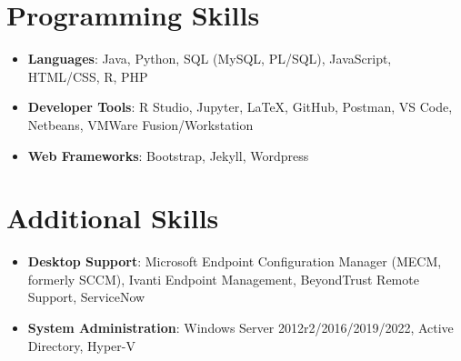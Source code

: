 \documentclass[letterpaper,11pt]{article}
\newcommand{\resumeItem}[2]{
  \item\small{
    \textbf{#1}{: #2 \vspace{-2pt}}
  }
}
\newcommand{\resumeSubItem}[2]{\resumeItem{#1}{#2}\vspace{-4pt}}
\newcommand{\resumeSubHeadingListStart}{\begin{itemize}[leftmargin=*]}
\newcommand{\resumeSubHeadingListEnd}{\end{itemize}}
\begin{document}
\section{Programming Skills}
  	\resumeSubHeadingListStart
    	\resumeSubItem{Languages}{Java, Python, SQL (MySQL, PL/SQL), JavaScript, HTML/CSS, R, PHP} 
   		\resumeSubItem{Developer Tools}{R Studio, Jupyter, LaTeX, GitHub, Postman, VS Code, Netbeans, VMWare Fusion/Workstation}
    	\resumeSubItem{Web Frameworks}{Bootstrap,  Jekyll, Wordpress} 
  	\resumeSubHeadingListEnd

\section{Additional Skills}
  	\resumeSubHeadingListStart
    	\resumeSubItem{Desktop Support}{Microsoft Endpoint Configuration Manager (MECM, formerly SCCM), Ivanti Endpoint Management, BeyondTrust Remote Support, ServiceNow}
   		\resumeSubItem{System Administration}{Windows Server 2012r2/2016/2019/2022, Active Directory, Hyper-V}
  	\resumeSubHeadingListEnd

\end{document}
